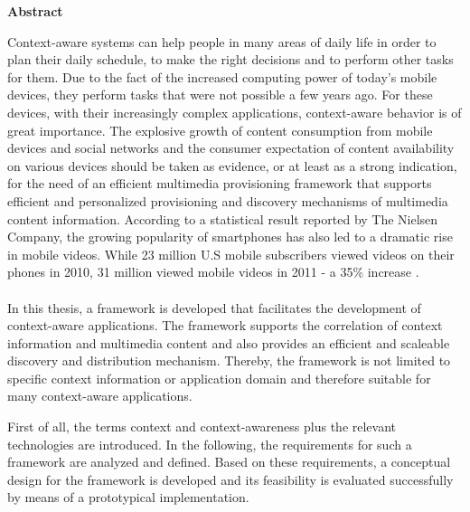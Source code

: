 \thispagestyle{empty}
\vspace*{1.0cm}

\begin{center}
    \textbf{Abstract}
\end{center}

\vspace*{0.5cm}

Context-aware systems can help people in many areas of daily life in order to plan their daily schedule, to make the right decisions  and to perform other tasks for them.
Due to the fact of the increased computing power of today's mobile devices, they perform tasks that were not possible a few years ago. For these devices, with their increasingly complex applications, context-aware behavior is of great importance. The explosive growth of content consumption from mobile devices and social networks and the consumer expectation of content availability on various devices should be taken as evidence, or at least as a strong indication, for the need of an efficient multimedia provisioning framework that supports efficient and personalized provisioning and discovery mechanisms of multimedia content information. According to a statistical result reported by The Nielsen Company, the growing popularity of smartphones has also led to a dramatic rise in mobile videos. While 23 million U.S mobile subscribers viewed videos on their phones in 2010, 31 million viewed mobile videos in 2011 - a 35\% increase \cite{mobile-media-report}. 
\\
\\
In this thesis, a framework is developed that facilitates the development of context-aware applications. The framework supports the correlation of context information and multimedia content and also provides an efficient and scaleable discovery and distribution mechanism. Thereby, the framework is not limited to specific context information or application domain and therefore suitable for many context-aware applications.

First of all, the terms context and context-awareness plus the relevant technologies are introduced. In the following, the requirements for such a framework are analyzed and defined. Based on these requirements, a conceptual design for the framework is developed and its feasibility is evaluated successfully by means of a prototypical implementation.

